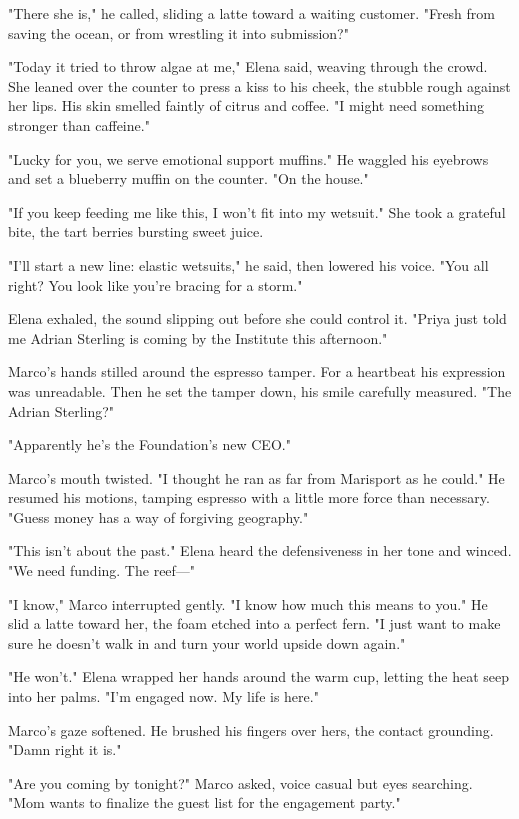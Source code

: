 "There she is," he called, sliding a latte toward a waiting customer. "Fresh from saving the ocean, or from wrestling it into submission?"

"Today it tried to throw algae at me," Elena said, weaving through the crowd. She leaned over the counter to press a kiss to his cheek, the stubble rough against her lips. His skin smelled faintly of citrus and coffee. "I might need something stronger than caffeine."

"Lucky for you, we serve emotional support muffins." He waggled his eyebrows and set a blueberry muffin on the counter. "On the house."

"If you keep feeding me like this, I won't fit into my wetsuit." She took a grateful bite, the tart berries bursting sweet juice.

"I'll start a new line: elastic wetsuits," he said, then lowered his voice. "You all right? You look like you're bracing for a storm."

Elena exhaled, the sound slipping out before she could control it. "Priya just told me Adrian Sterling is coming by the Institute this afternoon."

Marco's hands stilled around the espresso tamper. For a heartbeat his expression was unreadable. Then he set the tamper down, his smile carefully measured. "The Adrian Sterling?"

"Apparently he's the Foundation's new CEO."

Marco's mouth twisted. "I thought he ran as far from Marisport as he could." He resumed his motions, tamping espresso with a little more force than necessary. "Guess money has a way of forgiving geography."

"This isn't about the past." Elena heard the defensiveness in her tone and winced. "We need funding. The reef—"

"I know," Marco interrupted gently. "I know how much this means to you." He slid a latte toward her, the foam etched into a perfect fern. "I just want to make sure he doesn't walk in and turn your world upside down again."

"He won't." Elena wrapped her hands around the warm cup, letting the heat seep into her palms. "I'm engaged now. My life is here."

Marco's gaze softened. He brushed his fingers over hers, the contact grounding. "Damn right it is."

"Are you coming by tonight?" Marco asked, voice casual but eyes searching. "Mom wants to finalize the guest list for the engagement party."


